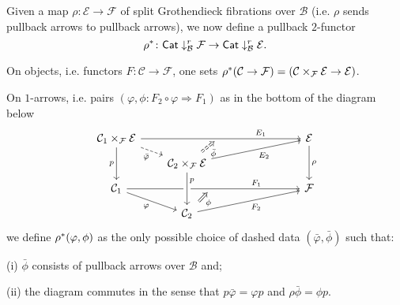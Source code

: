 \documentclass[a4paper,10pt
]{article}%
\numberwithin{equation}{section}
\numberwithin{figure}{section}
\theoremstyle{definition} %
\newcommand{\1}{\ensuremath{\mathbbm 1}}%
\begin{document}
Given a map $\rho \colon \mathcal{E} \to \mathcal{F}$
of split Grothendieck fibrations over $\mathcal{B}$
(i.e. $\rho$ sends pullback arrows to pullback arrows),
we now define a pullback $2$-functor 
\begin{equation}\label{WSPANPULL EQ}
\rho^{\**} \colon
\mathsf{Cat} \downarrow^r_\mathcal{B} \mathcal{F} 
\to
\mathsf{Cat} \downarrow^r_\mathcal{B} \mathcal{E}.
\end{equation}

On objects, i.e. functors $F \colon \mathcal{C} \to \mathcal{F}$, one sets 
$\rho^{\**}(\mathcal{C} \to \mathcal{F})=
(\mathcal{C} \times_{\mathcal{F}} \mathcal{E}
\to \mathcal{E})
$.

On $1$-arrows, i.e. pairs 
$(\varphi,\phi \colon F_2 \circ \varphi \Rightarrow F_1)$
as in the bottom of the diagram below
\[
\begin{tikzcd}[column sep = 20pt, row sep = 7pt]
\mathcal{C}_1 \times_{\mathcal{F}} \mathcal{E} 
\ar{rrrrr}[name=toE]{}[near end]{E_1} \ar[dashed]{rd}[swap]{\bar{\varphi}} \ar{dd}[swap]{p}
&&&
&&
\mathcal{E}  \ar{dd}{\rho}
\\
&
|[alias=DBE]|
\mathcal{C}_2 \times_{\mathcal{F}} \mathcal{E} \ar{rrrru}[swap]{E_2}
\\
\mathcal{C}_1 \ar{rrrrr}[name=toB]{}[near end]{F_1} \ar{rd}[swap]{\varphi}
&&&
&&
\mathcal{F} 
\\
&
|[alias=D]| \mathcal{C}_2 \ar{rrrru}[swap]{F_2}
\arrow[Rightarrow, from=DBE, to=toE, shorten <=0.15cm,shorten >=0.15cm,dashed
,swap,"\bar{\phi}"
]
\arrow[Rightarrow, from=D, to=toB, shorten <=0.15cm,shorten >=0.15cm,swap,"\phi"]
\arrow[from=DBE, to=D, crossing over, near start, "p"]
\end{tikzcd}
\]
we define $\rho^{\**}(\varphi,\phi)$ as the only possible choice of dashed data
$(\bar{\varphi},\bar{\phi})$ such that:
\begin{enumerate*}
\item[(i)] $\bar{\phi}$ consists of pullback arrows over $\mathcal{B}$
and;
\item[(ii)] the diagram commutes in the sense that
$p \bar{\varphi} = \varphi p$ and 
$\rho \bar{\phi} = \phi p$.
\end{enumerate*}
\end{document}
